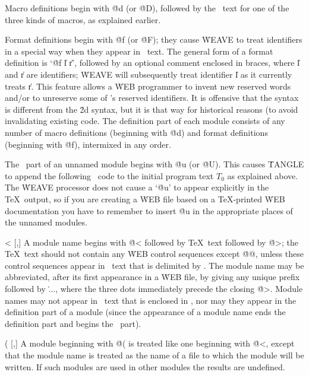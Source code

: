 \@d [\oP,\oT] Macro definitions begin with \.{@d} (or \.{@D}), followed by
the \PASCAL\ text for one of the three kinds of macros, as explained
earlier.

\@f [\oP,\oT] Format definitions begin with \.{@f} (or \.{@F}); they cause
\.{WEAVE} to treat identifiers in a special way when they appear in
\PASCAL\ text.
The general form of a format definition is `\.{@f} \|l %
\|r', followed by an optional comment enclosed in braces, where \|l and \|r
are identifiers; \.{WEAVE} will subsequently treat identifier \|l as it
currently treats \|r.
This feature allows a \.{WEB} programmer to invent
new reserved words and/or to unreserve some of \PASCAL's reserved
identifiers.
\newstuff
It is offensive that the syntax is different from the \.{2d} syntax,
but it is that way for historical reasons (to avoid invalidating
existing code. 
\endnewstuff
The definition part of each module consists of any number of
macro definitions (beginning with \.{@d}) and format definitions (beginning
with \.{@f}), intermixed in any order.


\@u [\oP,\oT] \newstuff
The \PASCAL\ part of an unnamed module begins with \.{@u}
(or \.{@U}).
\endnewstuff
This causes \.{TANGLE} to append the following \PASCAL\ code
to the initial program text $T_0$ as explained above.
The \.{WEAVE}
processor does not cause a `\.{@u}' to appear explicitly in the \TeX\
output, so if you are creating a \.{WEB} file based on a \TeX-printed
\.{WEB} documentation you have to remember to insert \.{@u} in the
appropriate places of the unnamed modules.

\@< [\PAS,\oT] A module name begins with \.{@<} followed by \TeX\ text followed
by \.{@>}; the \TeX\ text should not contain any \.{WEB} control sequences
except \.{@@}, unless these control sequences appear in \PASCAL\ text that
is delimited by \pb.
The module name may be abbreviated, after its first
appearance in a \.{WEB} file, by giving any unique prefix followed by \.{...},
where the three dots immediately precede the closing \.{@>}.
Module names may
not appear in \PASCAL\ text that is enclosed in \pb, nor may they appear
in the definition part of a module (since the appearance of a module name
ends the definition part and begins the \PASCAL\ part).


\@( [\PAS,\oT] \newstuff A module beginning
with \.{@(} is treated like one beginning with \.{@<},
except that the module name is treated as the name of a file to which
the module will be written.
If such modules are used in other modules the results are undefined.
\endnewstuff

